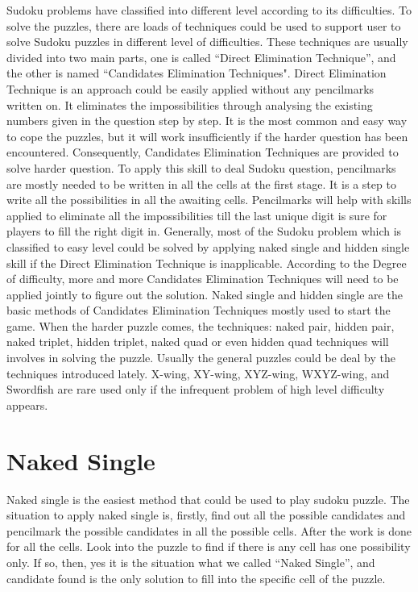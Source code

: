 \documentclass[11pt]{report}
\begin{document}
Sudoku problems have classified into different level according to its difficulties. To solve the puzzles, there are loads of techniques could be used to support user to solve Sudoku puzzles in different level of difficulties.
These techniques are usually divided into two main parts, one is called “Direct Elimination Technique”, and the other is named “Candidates Elimination Techniques".
Direct Elimination Technique is an approach could be easily applied without any pencilmarks written on. It eliminates the impossibilities through analysing the existing numbers given in the question step by step. It is the most common and easy way to cope the puzzles, but it will work insufficiently if the harder question has been encountered. 
Consequently, Candidates Elimination Techniques are provided to solve harder question. To apply this skill to deal Sudoku question, pencilmarks are mostly needed to be written in all the cells at the first stage. It is a step to write all the possibilities in all the awaiting cells. Pencilmarks will help with skills applied to eliminate all the impossibilities till the last unique digit is sure for players to fill the right digit in.
Generally, most of the Sudoku problem which is classified to easy level could be solved by applying naked single and hidden single skill if the Direct Elimination Technique is inapplicable. According to the Degree of difficulty, more and more Candidates Elimination Techniques will need to be applied jointly to figure out the solution. 
Naked single and hidden single are the basic methods of Candidates Elimination Techniques mostly used to start the game. When the harder puzzle comes, the techniques: naked pair, hidden pair, naked triplet, hidden triplet, naked quad or even hidden quad techniques will involves in solving the puzzle. Usually the general puzzles could be deal by the techniques introduced lately. X-wing, XY-wing, XYZ-wing, WXYZ-wing, and Swordfish are rare used only if the infrequent problem of high level difficulty appears. 


\section{Naked Single}
\label{sec:Naked Single}

Naked single is the easiest method that could be used to play sudoku puzzle. The situation to apply naked single is, firstly, find out all the possible candidates and pencilmark the possible candidates in all the possible cells. After the work is done for all the cells. Look into the puzzle to find if there is any cell has one possibility only. If so, then, yes it is the situation what we called ``Naked Single'', and candidate found is the only solution to fill into the specific cell of the puzzle.
\end{document}
